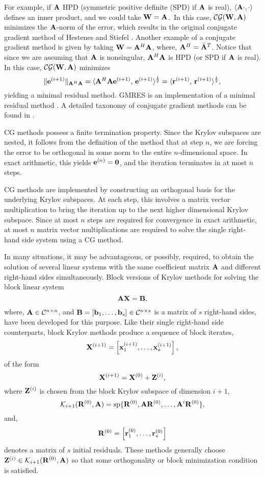 \documentclass{article}
\newcommand{\bA}{{\bf A}}
\newcommand{\bB}{{\bf B}}
\newcommand{\bR}{{\bf R}}
\newcommand{\bW}{{\bf W}}
\newcommand{\bX}{{\bf X}}
\newcommand{\bZ}{{\bf Z}}
\newcommand{\bx}{{\bf x}}
\newcommand{\br}{{\bf r}}
\newcommand{\be}{{\bf e}}
\newcommand{\bb}{{\bf b}}
\newcommand{\la}{\langle}
\newcommand{\ra}{\rangle}
\newcommand{\dm}{\begin{displaymath}}
\newcommand{\edm}{\end{displaymath}}
\newcommand{\eq}{\begin{equation}}
\newcommand{\eeq}{\end{equation}}
\begin{document}
For example, if $\bA$ HPD (symmetric positive definite (SPD) if
$\bA$ is real), $\la \bA \cdot, \cdot \ra$ defines an inner
product, and we could take $\bW = \bA$.\ In this case, ${\cal
CG}(\bW,\bA)$ minimizes the $\bA$-norm of the error, which results
in the original conjugate gradient method of Hestenes and Stiefel
\cite{HS52}. Another example of a conjugate gradient method is
given by taking $\bW = \bA^H \bA$, where, $\bA^H = {\bar \bA}^T$.
Notice that since we are assuming that $\bA$ is nonsingular,
$\bA^H \bA$ is HPD (or SPD if $\bA$ is real). In this case, ${\cal
CG}(\bW,\bA)$ minimizes
 \dm \| \be^{(i+1)} \|_{\bA^H\bA} = \la \bA^H \bA \be^{(i+1)},\, \be^{(i+1)} \ra^
 {\frac{1}{2}} = \la \br^{(i+1)},\, \br^{(i+1)} \ra^{\frac{1}{2}},
 \edm
yielding a minimal residual method.  GMRES is an implementation of
a minimal residual method \cite{SS86}.  A detailed taxonomy of
conjugate gradient methods can be found in \cite{AMS90}.

CG methods possess a finite termination property. Since the Krylov
subspaces are nested, it follows from the definition of the method
that at step $n$, we are forcing the error to be orthogonal in
some norm to the entire $n$-dimensional space. In exact
arithmetic, this yields $\be^{(n)} = {\bf 0}$, and the iteration
terminates in at most $n$ steps.

CG methods are implemented by constructing an orthogonal basis for
the underlying Krylov subspaces. At each step, this involves a
matrix vector multiplication to bring the iteration up to the next
higher dimensional Krylov subspace. Since at most $n$ steps are
required for convergence in exact arithmetic, at most $n$ matrix
vector multiplications are required to solve the single right-hand
side system using a CG method.

In many situations, it may be advantageous, or possibly, required,
to obtain the solution of several linear systems with the same
coefficient matrix $\bA$ and different right-hand sides
simultaneously. Block versions of Krylov methods for solving the
block linear system
 \eq
 \bA \bX = \bB,
 \label{eq:blocklinsys}
 \eeq
 where, $\bA \in {\cal C}^{n \times n}$, and
 $\bB = [\bb_1, \ldots, \bb_s] \in {\cal C}^{n \times s}$ is a matrix of $s$ right-hand
 sides, have been developed for this purpose. Like their single
 right-hand side counterparts, block Krylov methods produce a
 sequence of block iterates,
  \dm
 \bX^{(i+1)} = \left[ \bx_1^{(i+1)}, \ldots, \bx_s^{(i+1)}
 \right],
 \edm
 of the form
  \dm
  \bX^{(i+1)} = \bX^{(0)} + \bZ^{(i)},
  \edm
 where $\bZ^{(i)}$ is chosen from the block Krylov subspace of
 dimension $i+1$,
  \dm
 {\cal K}_{i+1}(\bR^{(0)},\bA) = {\rm sp}\{\bR^{(0)},\bA
 \bR^{(0)},\ldots,\bA^{i}\bR^{(0)}\},
 \edm
and,
  \dm
   \bR^{(0)} = \left[ \br_1^{(0)}, \ldots, \br_s^{(0)} \right]
  \edm
denotes a matrix of $s$ initial residuals. These methods generally
choose $\bZ^{(i)} \in {\cal K}_{i+1}(\bR^{(0)},\bA)$ so that some
orthogonality or block minimization condition is satisfied.
\end{document}

